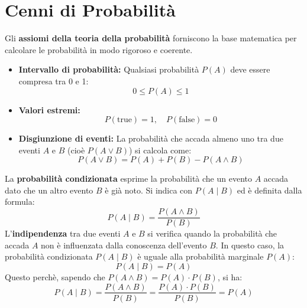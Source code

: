 \documentclass{report}
\begin{document}
	\section{Cenni di Probabilità}
	Gli \textbf{assiomi della teoria della probabilità} forniscono la base matematica per calcolare le probabilità in modo rigoroso e coerente.

	\begin{itemize}
    	\item \textbf{Intervallo di probabilità:}  
    	Qualsiasi probabilità $P(A)$ deve essere compresa tra 0 e 1:
		\[
		0 \leq P(A) \leq 1
		\]
		\item \textbf{Valori estremi:}  
		\[
		P(\text{true}) = 1, \quad P(\text{false}) = 0
		\]
		\item \textbf{Disgiunzione di eventi:}  
		La probabilità che accada almeno uno tra due eventi $A$ e $B$ (cioè $P(A \lor B)$) si calcola come:
		\[
		P(A \lor B) = P(A) + P(B) - P(A \land B)
		\]
	\end{itemize}
	La \textbf{probabilità condizionata} esprime la probabilità che un evento $A$ accada dato che un altro evento $B$ è già noto. Si indica con $P(A \mid B)$ ed è definita dalla formula:
	\[
	P(A \mid B) = \frac{P(A \land B)}{P(B)}
	\]
	L'\textbf{indipendenza} tra due eventi $A$ e $B$ si verifica quando la probabilità che accada $A$ non è influenzata dalla conoscenza dell'evento $B$. In questo caso, la probabilità condizionata $P(A \mid B)$ è uguale alla probabilità marginale $P(A)$:
	\[
	P(A \mid B) = P(A)
	\]
	Questo perchè, sapendo che $P(A \land B) = P(A) \cdot P(B)$, si ha:
	\[
	P(A \mid B) = \frac{P(A \land B)}{P(B)} = \frac{P(A) \cdot P(B)}{P(B)} = P(A)
	\]
\end{document}
